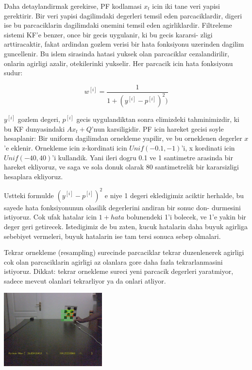\documentclass[12pt,fleqn]{article}
\begin{document}
Daha detaylandirmak gerekirse, PF kodlamasi $x_t$ icin iki tane veri yapisi
gerektirir. Bir veri yapisi dagilimdaki degerleri temsil eden
parcaciklardir, digeri ise bu parcaciklarin dagilimdaki onemini temsil eden
agirliklardir.  Filtreleme sistemi KF'e benzer, once bir gecis uygulanir,
ki bu gecis kararsi- zligi arttiracaktir, fakat ardindan gozlem verisi bir
hata fonksiyonu uzerinden dagilim guncellenir. Bu islem sirasinda hatasi
yuksek olan parcaciklar cezalandirilir, onlarin agirligi azalir,
otekilerinki yukselir. Her parcacik icin hata fonksiyonu sudur:

\[ 
w^{[i]} = \frac{1}{1 + (y^{[i]} - p^{[i]})^2  )}
 \]

$y^{[i]}$ gozlem degeri, $p^{[i]}$ gecis uygulandiktan sonra elimizdeki
tahminimizdir, ki bu KF dunyasindaki $Ax_t + Q$'nun karsiligidir. PF icin
hareket gecisi soyle hesaplanir: Bir uniform dagilimdan ornekleme yapilir,
ve bu orneklenen degerler $x$'e eklenir. Ornekleme icin z-kordinati icin
$Unif (-0.1, -1)$'i, x kordinati icin $Unif (-40, 40)$'i kullandik. Yani
ileri dogru 0.1 ve 1 santimetre arasinda bir hareket ekliyoruz, ve saga ve
sola donuk olarak 80 santimetrelik bir kararsizligi hesaplara ekliyoruz.

Ustteki formulde $(y^{[i]} - p^{[i]})^2$ e niye 1 degeri ekledigimiz
aciktir herhalde, bu sayede hata fonksiyonunun olasilik degerlerini andiran
bir sonuc don- durmesini istiyoruz. Cok ufak hatalar icin $1 + hata$
bolunendeki 1'i bolecek, ve 1'e yakin bir deger geri getirecek. Istedigimiz
de bu zaten, kucuk hatalarin daha buyuk agirliga sebebiyet vermeleri, buyuk
hatalarin ise tam tersi sonuca sebep olmalari.

Tekrar ornekleme (resampling) surecinde parcaciklar tekrar duzenlenerek
agirligi cok olan parcaciklarin agirligi az olanlara gore daha fazla
tekrarlanmasini istiyoruz. Dikkat: tekrar ornekleme sureci yeni parcacik
degerleri yaratmiyor, sadece mevcut olanlari tekrarliyor ya da onlari
atliyor.





\includegraphics[height=4cm]{cb-pf-1.jpg}
\end{document}
